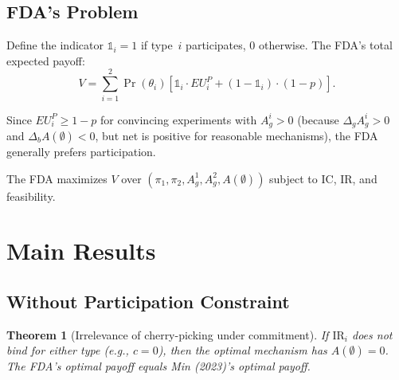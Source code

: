 \documentclass[12pt,a4paper]{article}
\newtheorem{theorem}{Theorem}
\begin{document}
\subsection{FDA's Problem}

Define the indicator $\mathbb{1}_i = 1$ if type~$i$
participates, $0$ otherwise. The FDA's total expected payoff:
\begin{equation}\label{eq:fda_total}
  V = \sum_{i=1}^{2} \Pr(\theta_i) \left[
    \mathbb{1}_i \cdot EU^P_i
    + (1 - \mathbb{1}_i) \cdot (1-p)
  \right].
\end{equation}

Since $EU^P_i \geq 1-p$ for convincing experiments with
$A_g^i > 0$ (because $\Delta_g A_g^i > 0$ and
$\Delta_b A(\emptyset) < 0$, but net is positive for
reasonable mechanisms), the FDA generally prefers
participation.

The FDA maximizes $V$ over
$(\pi_1, \pi_2, A_g^1, A_g^2, A(\emptyset))$ subject to
IC, IR, and feasibility.


\section{Main Results}
\label{sec:main}

\subsection{Without Participation Constraint}

\begin{theorem}[Irrelevance of cherry-picking under
  commitment]\label{thm:no_IR}
If $\mathrm{IR}_i$ does not bind for either type (e.g.,
$c = 0$), then the optimal mechanism has
$A(\emptyset) = 0$. The FDA's optimal payoff equals Min
(2023)'s optimal payoff.
\end{theorem}
\end{document}
